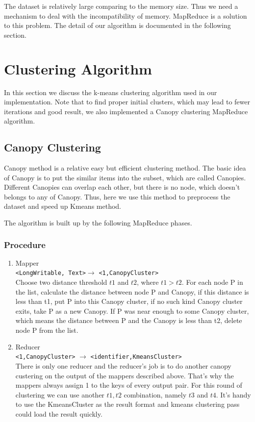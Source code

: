 \documentclass[a4paper,11pt]{article}
\begin{document}
The dataset is relatively large comparing to the memory size. Thus we need a
mechanism to deal with the incompatibility of memory. MapReduce is a solution to
this problem. The detail of our algorithm is documented in the following
section.

\section{Clustering Algorithm}
In this section we discuss the k-means clustering algorithm used in our
implementation. Note that to find proper initial clusters, which may lead to
fewer iterations and good result, we also implemented a Canopy clustering
MapReduce algorithm.
\subsection{Canopy Clustering}
Canopy method is a relative easy but efficient clustering method. The basic 
idea of Canopy is to put the similar items into the subset, which are called 
Canopies. Different Canopies can overlap each other, but there is no node, 
which doesn't belongs to any of Canopy. Thus, here we use this method to 
preprocess the dataset and speed up Kmeans method. 

The algorithm is built up by the following MapReduce phases.
\subsubsection{Procedure}
\begin{enumerate}
  \item Mapper \\
      \verb|<LongWritable, Text>|$\rightarrow$ \verb|<1,CanopyCluster>|\\
      Choose two distance threshold $t1$ and $t2$, where $t1>t2$. For each  
      node P in the list, calculate the distance between node 
      P and Canopy, if this distance is less than t1, put P into this 
      Canopy cluster, if no such kind Canopy cluster exits, take P as a new 
      Canopy. If P was near enough to some Canopy cluster, which means the 
      distance   between P and the Canopy is less than t2, delete 
      node P from the list. 
  \item Reducer\\
    \verb|<1,CanopyCluster>|  $\rightarrow$   
    \verb|<identifier,KmeansCluster>| \\
     There is only one reducer and the reducer's job is to do another canopy 
     custering on the output of the mappers described above. That's why the 
     mappers always assign 1 to the keys of every output pair.
     For this round of clustering we can use another $t1,t2$ combination, 
     namely $t3$ and $t4$. 
     It's handy to use the KmeansCluster as the result format and kmeans 
     clustering pass could load the result quickly.
\end{enumerate}
\end{document}
